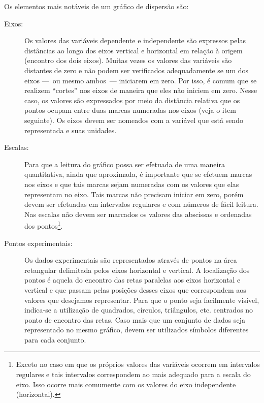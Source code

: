 Os elementos mais notáveis de um gráfico de dispersão são:
\begin{description}
	\item[Eixos:] Os valores das variáveis dependente e independente  são expressos pelas distâncias ao longo dos eixos vertical e horizontal em relação à origem (encontro dos dois eixos). Muitas vezes os valores das variáveis são distantes de zero e não podem ser verificados adequadamente se um dos eixos ---~ou mesmo ambos~--- iniciarem em zero. Por isso, é comum que se realizem ``cortes'' nos eixos de maneira que eles não iniciem em zero. Nesse caso, os valores são expressados por meio da distância relativa que os pontos ocupam entre duas marcas numeradas nos eixos (veja o item seguinte). Os eixos devem ser nomeados com a variável que está sendo representada e suas unidades.
	\item[Escalas:] Para que a leitura do gráfico possa ser efetuada de uma maneira quantitativa, ainda que aproximada, é importante que se efetuem marcas nos eixos e que tais marcas sejam numeradas com os valores que elas representam no eixo. Tais marcas não precisam iniciar em zero, porém devem ser efetuadas em intervalos regulares e com números de fácil leitura. Nas escalas não devem ser marcados os valores das abscissas e ordenadas dos pontos\footnote{Exceto no caso em que os próprios valores das variáveis ocorrem em intervalos regulares e tais intervalos correspondem ao mais adequado para a escala do eixo. Isso ocorre mais comumente com os valores do eixo independente (horizontal).}.
	\item[Pontos experimentais:] Os dados experimentais são representados através de pontos na área retangular delimitada pelos eixos horizontal e vertical. A localização dos pontos é aquela do encontro das retas paralelas aos eixos horizontal e vertical e que passam pelas posições desses eixos que correspondem aos valores que desejamos representar. Para que o ponto seja facilmente visível, indica-se a utilização de quadrados, círculos, triângulos, etc. centrados no ponto de encontro das retas. Caso mais que um conjunto de dados seja representado no mesmo gráfico, devem ser utilizados símbolos diferentes para cada conjunto.
\end{description}

